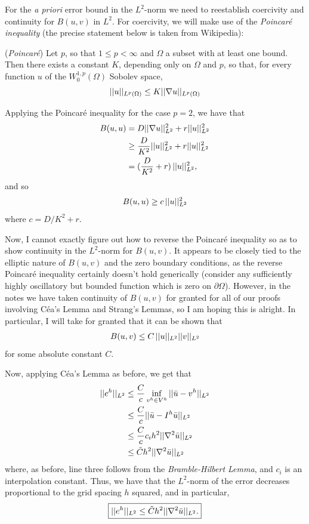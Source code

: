 \begin{solution}
For the \textit{a priori} error bound in the $L^2$-norm we need to reestablish coercivity and continuity for $B(u,v)$ in $L^2$.
For coercivity, we will make use of the \textit{Poincar\'e inequality} (the precise statement below is taken from Wikipedia):

\begin{theorem}{(\textit{Poincar\'e})}
Let $p$, so that $1 \leq p < \infty$ and $\Omega$ a subset with at least one bound. Then there exists a constant $K$, depending only on $\Omega$ and $p$, so that, for every function $u$ of the $W_0^{1,p}(\Omega)$ Sobolev space,
$$||u||_{L^p(\Omega)} \leq K ||\nabla u||_{L^p(\Omega)}$$
\end{theorem}

Applying the Poincar\'e inequality for the case $p=2$, we have that
\begin{align*}
B(u,u) &=
D ||\nabla u||_{L^2}^2 +
r ||u||_{L^2}^2 \\
&\geq
\frac{D}{K^2} ||u||_{L^2}^2 + 
r ||u||_{L^2}^2 \\
&= (\frac{D}{K^2} + r) \, ||u||_{L^2}^2,
\end{align*}
and so 
\begin{align}\label{L2_coercivity}
B(u,u) \geq c \, ||u||_{L^2}^2
\end{align}
where $c = D/K^2 + r$.

Now, I cannot exactly figure out how to reverse the Poincar\'e inequality so as to show continuity in the $L^2$-norm for $B(u,v)$.
It appears to be closely tied to the elliptic nature of $B(u,v)$ and the zero boundary conditions, as the reverse Poincar\'e inequality certainly doesn't hold generically (consider any sufficiently highly oscillatory but bounded function which is zero on $\partial \Omega$).
However, in the notes we have taken continuity of $B(u,v)$ for granted for all of our proofs involving C\'ea's Lemma and Strang's Lemmas, so I am hoping this is alright.
In particular, I will take for granted that it can be shown that \begin{align}\label{L2_continuity}
B(u,v) \leq C \, ||u||_{L^2} ||v||_{L^2}
\end{align}
for some absolute constant $C$.

Now, applying C\'ea's Lemma as before, we get that
\begin{align*}
||e^h||_{L^2}
&\leq \frac{C}{c} \inf_{v^h \in V^h} ||\bar{u} - v^h||_{L^2} \\
&\leq \frac{C}{c} ||\bar{u} - I^h \bar{u}||_{L^2} \\
&\leq
\frac{C}{c} c_i h^2 ||\nabla^2 \bar{u}||_{L^2} \\
&\leq
\tilde{C} h^2 ||\nabla^2 \bar{u}||_{L^2}
\end{align*}
where, as before, line three follows from the \textit{Bramble-Hilbert Lemma}, and $c_i$ is an interpolation constant.
Thus, we have that the $L^2$-norm of the error decreases proportional to the grid spacing $h$ squared, and in particular,
\begin{align}\label{L2_errorBound}
\boxed{||e^h||_{L^2} \leq \tilde{C} h^2 ||\nabla^2 \bar{u}||_{L^2}.}
\end{align}


\end{solution}
